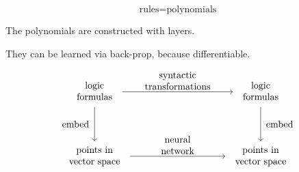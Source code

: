 

\title{}
\author{ {\footnotesize general.intelligence@gmail.com}}



	\setlength{\parindent}{0pt}
	\setlength{\parskip}{2.8ex plus0.8ex minus0.8ex}
	
	\maketitle
	
	\tableofcontents
	
\begin{abstract}
\end{abstract}

\begin{equation}
\mbox{rules} = \mbox{polynomials}
\end{equation}

The polynomials are constructed with layers.

They can be learned via back-prop, because differentiable.

\begin{equation}
\begin{tikzcd}[column sep = 10em, row sep = huge]
\begin{tabular}{c}logic\\formulas\end{tabular} \arrow[r, "syntactic\\transformations", align=center] \arrow[d, swap, "embed ", align=center]
& \begin{tabular}{c}logic\\formulas\end{tabular} \arrow[d, "\ embed", align=center] \\
\begin{tabular}{c}points in\\vector space\end{tabular} \arrow[r, "neural\\network", align=center] & \begin{tabular}{c}points in\\vector space\end{tabular}
\end{tikzcd}
\end{equation}

